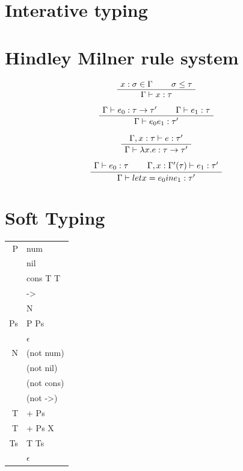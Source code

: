 \documentclass[a4paper]{report}
\newcommand{\sq}{\vdash}
\newcommand{\ax}[1]%
{\AxiomC{$#1$}}
\newcommand{\unc}[1]%
{\UnaryInfC{$#1$}}
\newcommand{\bic}[1]%
{\BinaryInfC{$#1$}}
\newcommand{\drule}%
{\DisplayProof}
\begin{document}
\section{Interative typing}


\section{Hindley Milner rule system}

\begin{equation}
\ax{x:\sigma\in\Gamma}
\ax{\sigma\leq\tau}
\bic{\Gamma\sq x:\tau}
\drule
\end{equation}

\begin{equation}
\ax{\Gamma\sq e_0:\tau\to\tau'}
\ax{\Gamma\sq e_1:\tau}
\bic{\Gamma\sq e_0 e_1 : \tau'}
\drule
\end{equation}

\begin{equation}
\ax{\Gamma,x:\tau\sq e:\tau'}
\unc{\Gamma\sq\lambda x.e:\tau\to\tau'}
\drule
\end{equation}

\begin{equation}
\ax{\Gamma\vdash e_0:\tau}
\ax{\Gamma,x:\Gamma'(\tau)\vdash e_1:\tau'}
\bic{\Gamma\vdash let x = e_0 in e_1:\tau'}
\drule
\end{equation}

\section{Soft Typing}
\begin{tabular}{|r|l|}
\hline
P & num\\
& nil\\
& cons T T\\
& ->\\
& N\\
\hline
Ps & P Ps\\
& $\epsilon$\\
\hline
N & (not num)\\
& (not nil)\\
& (not cons)\\
& (not ->)\\
\hline
T & + Ps\\
T & + Ps X\\
\hline
Ts & T Ts\\
& $\epsilon$\\
\hline
\end{tabular}
\end{document}
